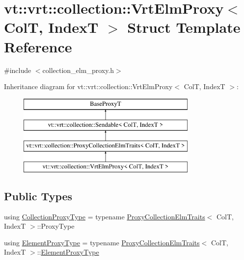 \hypertarget{structvt_1_1vrt_1_1collection_1_1_vrt_elm_proxy}{}\section{vt\+:\+:vrt\+:\+:collection\+:\+:Vrt\+Elm\+Proxy$<$ ColT, IndexT $>$ Struct Template Reference}
\label{structvt_1_1vrt_1_1collection_1_1_vrt_elm_proxy}


{\ttfamily \#include $<$collection\+\_\+elm\+\_\+proxy.\+h$>$}

Inheritance diagram for vt\+:\+:vrt\+:\+:collection\+:\+:Vrt\+Elm\+Proxy$<$ ColT, IndexT $>$\+:\begin{figure}[H]
\begin{center}
\leavevmode
\includegraphics[height=4.000000cm]{structvt_1_1vrt_1_1collection_1_1_vrt_elm_proxy}
\end{center}
\end{figure}
\subsection*{Public Types}
\begin{DoxyCompactItemize}
\item 
using \hyperlink{structvt_1_1vrt_1_1collection_1_1_vrt_elm_proxy_a9c343359753f719f62ea62db1fba766a}{Collection\+Proxy\+Type} = typename \hyperlink{structvt_1_1vrt_1_1collection_1_1_proxy_collection_elm_traits}{Proxy\+Collection\+Elm\+Traits}$<$ ColT, IndexT $>$\+::Proxy\+Type
\item 
using \hyperlink{structvt_1_1vrt_1_1collection_1_1_vrt_elm_proxy_aacc04b2ee9b318fba6f8641fec4b1316}{Element\+Proxy\+Type} = typename \hyperlink{structvt_1_1vrt_1_1collection_1_1_proxy_collection_elm_traits}{Proxy\+Collection\+Elm\+Traits}$<$ ColT, IndexT $>$\+::\hyperlink{structvt_1_1vrt_1_1collection_1_1_vrt_elm_proxy_aacc04b2ee9b318fba6f8641fec4b1316}{Element\+Proxy\+Type}
\end{DoxyCompactItemize}
